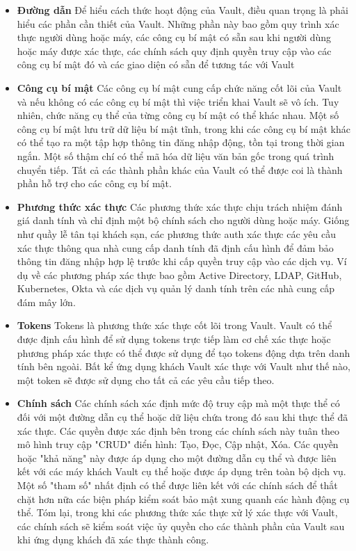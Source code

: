 \documentclass[12pt,a4paper]{report}
\begin{document}
	\begin{itemize}
		\item \textbf{Đường dẫn}
		\smallskip
		\subitem
			{Để hiểu cách thức hoạt động của Vault, điều quan trọng là phải hiểu các phần cần thiết của Vault. Những phần này bao gồm quy trình xác thực người dùng hoặc máy, các công cụ bí mật có sẵn sau khi người dùng hoặc máy được xác thực, các chính sách quy định quyền truy cập vào các công cụ bí mật đó và các giao diện có sẵn để tương tác với Vault}
		\item \textbf{Công cụ bí mật}
		\smallskip
		\subitem
			{Các công cụ bí mật cung cấp chức năng cốt lõi của Vault và nếu không có các công cụ bí mật thì việc triển khai Vault sẽ vô ích. Tuy nhiên, chức năng cụ thể của từng công cụ bí mật có thể khác nhau.}
			{Một số công cụ bí mật lưu trữ dữ liệu bí mật tĩnh, trong khi các công cụ bí mật khác có thể tạo ra một tập hợp thông tin đăng nhập động, tồn tại trong thời gian ngắn. Một số thậm chí có thể mã hóa dữ liệu văn bản gốc trong quá trình chuyển tiếp. Tất cả các thành phần khác của Vault có thể được coi là thành phần hỗ trợ cho các công cụ bí mật.}
		\item \textbf{Phương thức xác thực}
		\smallskip
		\subitem
			{Các phương thức xác thực chịu trách nhiệm đánh giá danh tính và chỉ định một bộ chính sách cho người dùng hoặc máy. Giống như quầy lễ tân tại khách sạn, các phương thức auth xác thực các yêu cầu xác thực thông qua nhà cung cấp danh tính đã định cấu hình để đảm bảo thông tin đăng nhập hợp lệ trước khi cấp quyền truy cập vào các dịch vụ. Ví dụ về các phương pháp xác thực bao gồm Active Directory, LDAP, GitHub, Kubernetes, Okta và các dịch vụ quản lý danh tính trên các nhà cung cấp đám mây lớn.}
		\item \textbf{Tokens}
		\smallskip
		\subitem
			{Tokens là phương thức xác thực cốt lõi trong Vault. Vault có thể được định cấu hình để sử dụng tokens trực tiếp làm cơ chế xác thực hoặc phương pháp xác thực có thể được sử dụng để tạo tokens động dựa trên danh tính bên ngoài. Bất kể ứng dụng khách Vault xác thực với Vault như thế nào, một token sẽ được sử dụng cho tất cả các yêu cầu tiếp theo.}
		\item \textbf{Chính sách}
		\smallskip
		\subitem
			{Các chính sách xác định mức độ truy cập mà một thực thể có đối với một đường dẫn cụ thể hoặc dữ liệu chứa trong đó sau khi thực thể đã xác thực. Các quyền được xác định bên trong các chính sách này tuân theo mô hình truy cập "CRUD" điển hình: Tạo, Đọc, Cập nhật, Xóa. Các quyền hoặc "khả năng" này được áp dụng cho một đường dẫn cụ thể và được liên kết với các máy khách Vault cụ thể hoặc được áp dụng trên toàn bộ dịch vụ. Một số "tham số" nhất định có thể được liên kết với các chính sách để thắt chặt hơn nữa các biện pháp kiểm soát bảo mật xung quanh các hành động cụ thể. Tóm lại, trong khi các phương thức xác thực xử lý xác thực với Vault, các chính sách sẽ kiểm soát việc ủy quyền cho các thành phần của Vault sau khi ứng dụng khách đã xác thực thành công.}
	\end{itemize}
\end{document}

